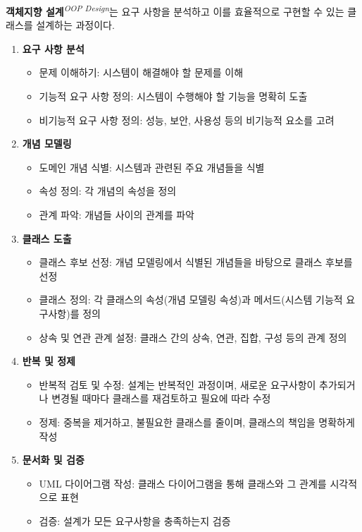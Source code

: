 \textbf{객체지향 설계}\textit{\textsuperscript{OOP Design}}는 요구 사항을 분석하고 이를 효율적으로 구현할 수 있는 클래스를 설계하는 과정이다.
\begin{enumerate}
\item \textbf{요구 사항 분석}
    \begin{itemize}
    \item 문제 이해하기: 시스템이 해결해야 할 문제를 이해
    \item 기능적 요구 사항 정의: 시스템이 수행해야 할 기능을 명확히 도출
    \item 비기능적 요구 사항 정의: 성능, 보안, 사용성 등의 비기능적 요소를 고려
    \end{itemize}
\item \textbf{개념 모델링}
    \begin{itemize}
    \item 도메인 개념 식별: 시스템과 관련된 주요 개념들을 식별
    \item 속성 정의: 각 개념의 속성을 정의
    \item 관계 파악: 개념들 사이의 관계를 파악
    \end{itemize}
\item \textbf{클래스 도출}
    \begin{itemize}
    \item 클래스 후보 선정: 개념 모델링에서 식별된 개념들을 바탕으로 클래스 후보를 선정
    \item 클래스 정의: 각 클래스의 속성(개념 모델링 속성)과 메서드(시스템 기능적 요구사항)를 정의
    \item 상속 및 연관 관계 설정: 클래스 간의 상속, 연관, 집합, 구성 등의 관계 정의
    \end{itemize}
\item \textbf{반복 및 정제}
    \begin{itemize}
        \item 반복적 검토 및 수정: 설계는 반복적인 과정이며, 새로운 요구사항이 추가되거나 변경될 때마다 클래스를 재검토하고 필요에 따라 수정
        \item 정제: 중복을 제거하고, 불필요한 클래스를 줄이며, 클래스의 책임을 명확하게 작성
    \end{itemize}
\item \textbf{문서화 및 검증}
    \begin{itemize}
        \item UML 다이어그램 작성: 클래스 다이어그램을 통해 클래스와 그 관계를 시각적으로 표현
        \item 검증: 설계가 모든 요구사항을 충족하는지 검증
    \end{itemize}
\end{enumerate}

